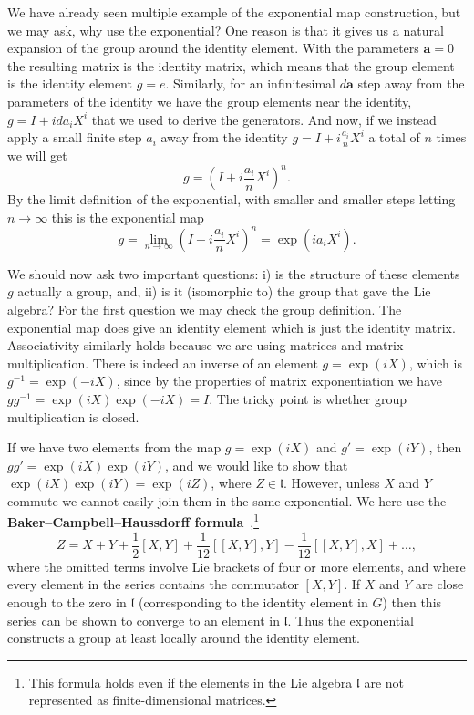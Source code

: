 \documentclass[notes.tex]{subfiles}
\begin{document}
We have already seen multiple example of the exponential map construction, but we may ask, why use the exponential? One reason is that it gives us a natural expansion of the group around the identity element. With the parameters $\mathbf a=0$ the resulting matrix is the identity matrix, which means that the group element is the identity element $g=e$. Similarly, for an infinitesimal $d\mathbf a$ step away from the parameters of the identity we have the group elements near the identity, $g=I+ida_iX^i$ that we used to derive the generators. And now, if we instead apply a small finite step  $a_i$ away from the identity $g=I+i\frac{a_i}{n}X^i$ a total of $n$ times we will get
\[g=\left(I+i\frac{a_i}{n}X^i\right)^n. \]
By the limit definition of the exponential, with smaller and smaller steps letting $n\to\infty$ this is the exponential map
\[g=\lim_{n\to\infty}\left(I+i\frac{a_i}{n}X^i\right)^n=\exp( ia_iX^i). \]

We should now ask two important questions: i) is the structure of these elements $g$ actually a group, and, ii) is it (isomorphic to) the group that gave the Lie algebra? For the first question we may check the group definition. The exponential map does give an identity element which is just the identity matrix. Associativity similarly holds because we are using matrices and matrix multiplication. There is indeed an inverse of an element $g=\exp{(iX)}$, which is $g^{-1}=\exp{(-iX)}$, since by the properties of matrix exponentiation we have $gg^{-1}=\exp{(iX)}\exp{(-iX)}=I$. The tricky point is whether group multiplication is closed.

If we have two elements from the map $g=\exp{(iX)}$ and $g'=\exp{(iY)}$, then $gg'=\exp{(iX)}\exp{(iY)}$, and we would like to show that  $\exp{(iX)}\exp{(iY)}=\exp{(iZ)}$, where $Z\in\mathfrak l$. However, unless $X$ and $Y$ commute we cannot  easily join them in the same exponential. We here use the {\bf Baker--Campbell--Haussdorff  formula}~\cite{Campbell1896},\footnote{This formula holds even if the elements in the Lie algebra ${\mathfrak l}$ are not represented as finite-dimensional matrices.} 
\begin{equation}
Z=X+Y+\frac{1}{2}[X,Y]+\frac{1}{12}[[X,Y],Y]-\frac{1}{12}[[X,Y],X]+\ldots,
\label{eq:BKH_matrices}
\end{equation}
where the omitted terms involve Lie brackets of four or more elements, and where every element in the series contains the commutator $[X,Y]$. If $X$ and $Y$ are close enough to the zero in $\mathfrak l$ (corresponding to the identity element in $G$) then this series can be shown to converge to an element in $\mathfrak l$. Thus the exponential constructs a group at least locally around the identity element.
\end{document}
